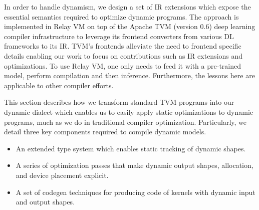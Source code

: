 In order to handle dynamism, we design a set of IR extensions which expose the essential semantics required to optimize dynamic programs. The approach is implemented in Relay VM on top of the Apache TVM (version 0.6) deep learning compiler infrastructure \citep{tvm_osdi18} to leverage its frontend converters from various DL frameworks to its IR. TVM's frontends alleviate the need to frontend specific details enabling our work to focus on contributions such as IR extensions and optimizations. To use Relay VM, one only needs to feed it with a pre-trained model, perform compilation and then inference. Furthermore, the lessons
here are applicable to other compiler efforts.

This section describes how we transform standard TVM programs into our dynamic dialect which enables us to easily apply static optimizations to dynamic programs, much as we do in traditional compiler optimization. Particularly, we detail three key components required to compile dynamic models.

\begin{itemize}
    \item An extended type system which enables static tracking of dynamic shapes.
    \item A series of optimization passes that make dynamic output shapes, allocation, and device placement explicit.
    \item A set of codegen techniques for producing code of kernels with dynamic input and output shapes.
\end{itemize}



